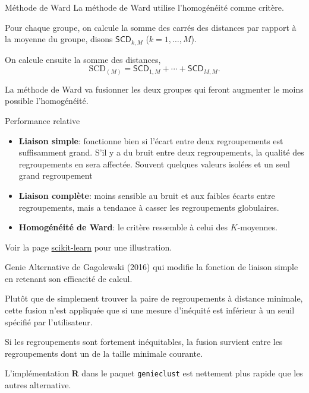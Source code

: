 \documentclass[
  ignorenonframetext,
]{beamer}
\begin{document}
\begin{frame}{Méthode de Ward}
\protect\hypertarget{muxe9thode-de-ward}{}
La méthode de Ward utilise l'homogénéité comme critère.

Pour chaque groupe, on calcule la somme des carrés des distances par
rapport à la moyenne du groupe, disons \(\mathsf{SCD}_{k,M}\)
(\(k=1, \ldots, M\)).

On calcule ensuite la somme des distances,
\[\mathrm{SCD}_{(M)} = \mathsf{SCD}_{1,M} + \cdots + \mathsf{SCD}_{M,M}.\]

La méthode de Ward va fusionner les deux groupes qui feront augmenter le
moins possible l'homogénéité.
\end{frame}

\begin{frame}{Performance relative}
\protect\hypertarget{performance-relative}{}
\begin{itemize}
\item
  \textbf{Liaison simple}: fonctionne bien si l'écart entre deux
  regroupements est suffisamment grand. S'il y a du bruit entre deux
  regroupements, la qualité des regroupements en sera affectée. Souvent
  quelques valeurs isolées et un seul grand regroupement
\item
  \textbf{Liaison complète}: moins sensible au bruit et aux faibles
  écarts entre regroupements, mais a tendance à casser les regroupements
  globulaires.
\item
  \textbf{Homogénéité de Ward}: le critère ressemble à celui des
  \(K\)-moyennes.
\end{itemize}

Voir la page
\href{https://scikit-learn.org/stable/auto_examples/cluster/plot_linkage_comparison.html}{scikit-learn}
pour une illustration.
\end{frame}

\begin{frame}[fragile]{Genie}
\protect\hypertarget{genie}{}
Alternative de Gagolewski (2016) qui modifie la fonction de liaison
simple en retenant son efficacité de calcul.

Plutôt que de simplement trouver la paire de regroupements à distance
minimale, cette fusion n'est appliquée que si une mesure d'inéquité est
inférieur à un seuil spécifié par l'utilisateur.

Si les regroupements sont fortement inéquitables, la fusion survient
entre les regroupements dont un de la taille minimale courante.

L'implémentation \textbf{R} dans le paquet \texttt{genieclust} est
nettement plus rapide que les autres alternative.
\end{frame}
\end{document}
